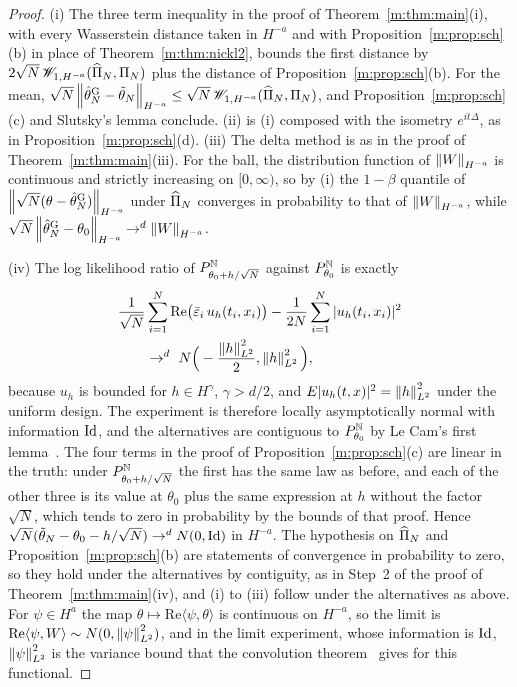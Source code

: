 \begin{proof}
(i) The three term inequality in the proof of Theorem~\ref{m:thm:main}(i), with every Wasserstein distance taken in $H^{-a}$ and with Proposition~\ref{m:prop:sch}(b) in place of Theorem~\ref{m:thm:nickl2}, bounds the first distance by $2\sqrt N\,\mathscr{W}_{1,H^{-a}}(\widehat\Pi_N,\Pi_N)$ plus the distance of Proposition~\ref{m:prop:sch}(b). For the mean, $\sqrt N\left\|\hat\theta^{\rm G}_N-\tilde\theta_N\right\|_{H^{-a}}\le\sqrt N\,\mathscr{W}_{1,H^{-a}}(\widehat\Pi_N,\Pi_N)$, and Proposition~\ref{m:prop:sch}(c) and Slutsky's lemma conclude. (ii) is (i) composed with the isometry $e^{it\Delta}$, as in Proposition~\ref{m:prop:sch}(d). (iii) The delta method is as in the proof of Theorem~\ref{m:thm:main}(iii). For the ball, the distribution function of $\left\|W\right\|_{H^{-a}}$ is continuous and strictly increasing on $[0,\infty)$, so by (i) the $1-\beta$ quantile of $\left\|\sqrt N(\theta-\hat\theta^{\rm G}_N)\right\|_{H^{-a}}$ under $\widehat\Pi_N$ converges in probability to that of $\left\|W\right\|_{H^{-a}}$, while $\sqrt N\left\|\hat\theta^{\rm G}_N-\theta_0\right\|_{H^{-a}}\to^d\left\|W\right\|_{H^{-a}}$.

(iv) The log likelihood ratio of $P^{\mathbb{N}}_{\theta_0+h/\sqrt N}$ against $P^{\mathbb{N}}_{\theta_0}$ is exactly
\[
\begin{aligned}
&\frac1{\sqrt N}\sum_{i=1}^N\mathrm{Re}\big(\bar\varepsilon_i\,u_h(t_i,x_i)\big)-\frac1{2N}\sum_{i=1}^N|u_h(t_i,x_i)|^2\\
&\qquad\to^d\ N\Big(-\frac{\left\|h\right\|^2_{L^2}}2,\left\|h\right\|^2_{L^2}\Big),
\end{aligned}
\]
because $u_h$ is bounded for $h\in H^\gamma$, $\gamma>d/2$, and $E|u_h(t,x)|^2=\left\|h\right\|^2_{L^2}$ under the uniform design. The experiment is therefore locally asymptotically normal with information $\operatorname{Id}$, and the alternatives are contiguous to $P^{\mathbb{N}}_{\theta_0}$ by Le Cam's first lemma~\cite[Section~6.2]{vandervaart1998}. The four terms in the proof of Proposition~\ref{m:prop:sch}(c) are linear in the truth: under $P^{\mathbb{N}}_{\theta_0+h/\sqrt N}$ the first has the same law as before, and each of the other three is its value at $\theta_0$ plus the same expression at $h$ without the factor $\sqrt N$, which tends to zero in probability by the bounds of that proof. Hence $\sqrt N(\tilde\theta_N-\theta_0-h/\sqrt N)\to^dN(0,\operatorname{Id})$ in $H^{-a}$. The hypothesis on $\widehat\Pi_N$ and Proposition~\ref{m:prop:sch}(b) are statements of convergence in probability to zero, so they hold under the alternatives by contiguity, as in Step~2 of the proof of Theorem~\ref{m:thm:main}(iv), and (i) to (iii) follow under the alternatives as above. For $\psi\in H^a$ the map $\theta\mapsto\mathrm{Re}\langle\psi,\theta\rangle$ is continuous on $H^{-a}$, so the limit is $\mathrm{Re}\langle\psi,W\rangle\sim N(0,\left\|\psi\right\|^2_{L^2})$, and in the limit experiment, whose information is $\operatorname{Id}$, $\left\|\psi\right\|^2_{L^2}$ is the variance bound that the convolution theorem~\cite[Section~3.12]{vandervaartwellner2023} gives for this functional.
\end{proof}

